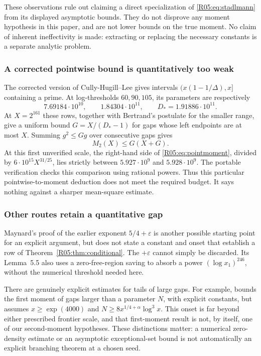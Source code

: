 \documentclass[11pt,a4paper]{article}
\theoremstyle{definition}\newtheorem{definition}[theorem]{Definition}
\theoremstyle{remark}\newtheorem{remark}[theorem]{Remark}
\begin{document}
These observations rule out claiming a direct specialization of
\eqref{R05:eq:stadlmann} from its displayed asymptotic bounds. They do
not disprove any moment hypothesis in this paper, and are not lower
bounds on the true moment. No claim of inherent ineffectivity is
made: extracting or replacing the necessary constants is a separate
analytic problem.

\subsubsection{A corrected pointwise bound is quantitatively too weak}

The corrected version of Cully-Hugill--Lee \cite{R05-CHL} gives intervals
$(x(1-1/\Delta),x]$ containing a prime. At log-thresholds $60,90,105$,
its parameters are respectively
\[
 7.69184\cdot10^{10},\qquad1.84304\cdot10^{11},\qquad
 D_*=1.91886\cdot10^{11}.
\]
At $X=2^{161}$ these rows, together with Bertrand's postulate for the
smaller range, give a uniform bound
$G=X/(D_*-1)$ for gaps whose left endpoints are at most $X$.
Summing $g^2\le Gg$ over consecutive gaps gives
\begin{equation}\label{R05:eq:pointmoment}
 M_2(X)\le G(X+G).
\end{equation}
At this first unverified scale, the right-hand side of
\eqref{R05:eq:pointmoment}, divided by $6\cdot10^{15}X^{31/25}$,
lies strictly between $5.927\cdot10^9$ and $5.928\cdot10^9$.
The portable verification checks this comparison using rational
powers. Thus this particular pointwise-to-moment deduction does not
meet the required budget. It says nothing against a sharper
mean-square estimate.

\subsubsection{Other routes retain a quantitative gap}

Maynard's proof of the earlier exponent $5/4+\varepsilon$
\cite{Maynard} is another possible starting point for an explicit
argument, but does not state a constant and onset that establish a
row of Theorem~\ref{R05:thm:conditional}. The $+\varepsilon$ cannot
simply be discarded. Its Lemma~5.5 also uses a zero-free-region
saving to absorb a power $(\log x_1)^{246}$, without the numerical
threshold needed here.

There are genuinely explicit estimates for tails of large gaps.
For example, \cite[Theorem~3.3]{R05-AFGW} bounds the first moment of gaps
larger than a parameter $N$, with explicit constants, but assumes
$x\ge\exp(4000)$ and $N\ge8x^{1/4+\alpha}\log^3x$.
This onset is far beyond either prescribed frontier scale, and that
first-moment result is not, by itself, one of our second-moment
hypotheses. These distinctions matter: a numerical zero-density
estimate or an asymptotic exceptional-set bound is not automatically
an explicit branching theorem at a chosen seed.
\end{document}
